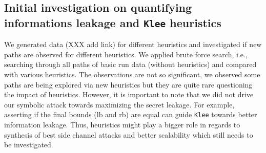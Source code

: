 \documentclass[11pt,a4paper,notitlepage]{article}
\begin{document}
\subsection{Initial investigation on quantifying informations leakage and \texttt{Klee} heuristics}
\label{subsec:initialinvestigationleakage}

We generated data (XXX add link) for different heuristics and investigated if new paths are observed for different heuristics.
We applied brute force search, i.e., searching through all paths of basic run data (without heuristics) and compared with various heuristics.
The observations are not so significant, we observed some paths are being explored via new heuristics but they are quite rare questioning the impact of heuristics.
However, it is important to note that we did not drive our symbolic attack towards maximizing the secret leakage.
For example, asserting if the final bounds (lb and rb) are equal can guide \texttt{Klee} towards better information leakage.
Thus, heuristics might play a bigger role in regards to synthesis of best side channel attacks and better scalability which still needs to be investigated.





\end{document}
